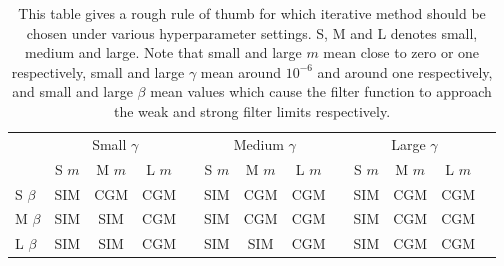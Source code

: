 
\begin{table}[t]
    \centering
    \footnotesize
    \def\arraystretch{1.4}
    \begin{tabular}{@{}lcccccccccccc@{}}
    \toprule
    & \multicolumn{3}{c}{Small $\gamma$} & \phantom{a} & \multicolumn{3}{c}{Medium $\gamma$} & \phantom{a} & \multicolumn{3}{c}{Large $\gamma$} \\
    \cmidrule{2-4} \cmidrule{6-8} \cmidrule{10-12}
    & S $m$   & M $m$  & L $m$ &&  S $m$   & M $m$  & L $m$ && S $m$   & M $m$  & L $m$ & \\ \midrule \rule{0pt}{0.8cm}
    S $\beta$  & \colorbox{sim!25}{SIM} & \colorbox{cgm!25}{CGM} & \colorbox{cgm!25}{CGM} && \colorbox{sim!25}{SIM} & \colorbox{cgm!25}{CGM} & \colorbox{cgm!25}{CGM} &&  \colorbox{sim!25}{SIM} & \colorbox{cgm!25}{CGM} & \colorbox{cgm!25}{CGM}    \\ \rule{0pt}{6ex}
    M $\beta$ & \colorbox{sim!25}{SIM} & \colorbox{sim!25}{SIM} & \colorbox{cgm!25}{CGM} && \colorbox{sim!25}{SIM} & \colorbox{cgm!25}{CGM} & \colorbox{cgm!25}{CGM} &&  \colorbox{sim!25}{SIM} & \colorbox{cgm!25}{CGM} & \colorbox{cgm!25}{CGM}    \\ \rule{0pt}{6ex}
    L $\beta$  & \colorbox{sim!25}{SIM} & \colorbox{sim!25}{SIM} & \colorbox{cgm!25}{CGM} && \colorbox{sim!25}{SIM} & \colorbox{sim!25}{SIM} & \colorbox{cgm!25}{CGM} &&  \colorbox{sim!25}{SIM} & \colorbox{cgm!25}{CGM} & \colorbox{cgm!25}{CGM}   \\[0.5cm] \bottomrule 
    \end{tabular}
    \caption[Rules of thumb for iterative method choice under different hyperparameter settings]{This table gives a rough rule of thumb for which iterative method should be chosen under various hyperparameter settings. S, M and L denotes small, medium and large. Note that small and large $m$ mean close to zero or one respectively, small and large $\gamma$ mean around $10^{-6}$ and around one respectively, and small and large $\beta$ mean values which cause the filter function to approach the weak and strong filter limits respectively. }
    \label{tab:decision_SIM_CGM} 
\end{table}








